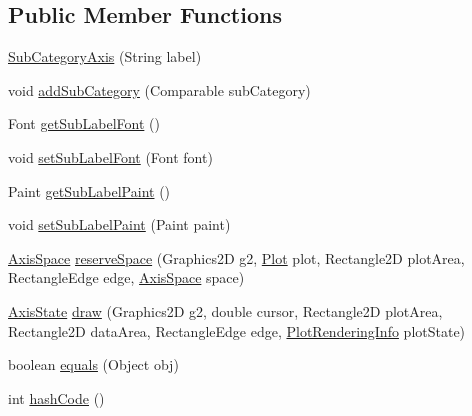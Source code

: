\subsection*{Public Member Functions}
\begin{DoxyCompactItemize}
\item 
\mbox{\hyperlink{classorg_1_1jfree_1_1chart_1_1axis_1_1_sub_category_axis_aa390eacde9febfc38334f4cbb459934f}{Sub\+Category\+Axis}} (String label)
\item 
void \mbox{\hyperlink{classorg_1_1jfree_1_1chart_1_1axis_1_1_sub_category_axis_ab0768eff94549a4a670454a1e7070d35}{add\+Sub\+Category}} (Comparable sub\+Category)
\item 
Font \mbox{\hyperlink{classorg_1_1jfree_1_1chart_1_1axis_1_1_sub_category_axis_a8ba516ab1bc79bf6b3f2a0e98e25f759}{get\+Sub\+Label\+Font}} ()
\item 
void \mbox{\hyperlink{classorg_1_1jfree_1_1chart_1_1axis_1_1_sub_category_axis_a1b3e317afd77a78715ddcf1465be1461}{set\+Sub\+Label\+Font}} (Font font)
\item 
Paint \mbox{\hyperlink{classorg_1_1jfree_1_1chart_1_1axis_1_1_sub_category_axis_aef43f68433c27fb74ddc51d40681f91e}{get\+Sub\+Label\+Paint}} ()
\item 
void \mbox{\hyperlink{classorg_1_1jfree_1_1chart_1_1axis_1_1_sub_category_axis_a92b94ccece53829f092607e7331cd7ef}{set\+Sub\+Label\+Paint}} (Paint paint)
\item 
\mbox{\hyperlink{classorg_1_1jfree_1_1chart_1_1axis_1_1_axis_space}{Axis\+Space}} \mbox{\hyperlink{classorg_1_1jfree_1_1chart_1_1axis_1_1_sub_category_axis_aa5dffd9ba5e9aa087a9cf9ef801433fc}{reserve\+Space}} (Graphics2D g2, \mbox{\hyperlink{classorg_1_1jfree_1_1chart_1_1plot_1_1_plot}{Plot}} plot, Rectangle2D plot\+Area, Rectangle\+Edge edge, \mbox{\hyperlink{classorg_1_1jfree_1_1chart_1_1axis_1_1_axis_space}{Axis\+Space}} space)
\item 
\mbox{\hyperlink{classorg_1_1jfree_1_1chart_1_1axis_1_1_axis_state}{Axis\+State}} \mbox{\hyperlink{classorg_1_1jfree_1_1chart_1_1axis_1_1_sub_category_axis_aaf0dd053b90ccc1ae26da1391e5a7c59}{draw}} (Graphics2D g2, double cursor, Rectangle2D plot\+Area, Rectangle2D data\+Area, Rectangle\+Edge edge, \mbox{\hyperlink{classorg_1_1jfree_1_1chart_1_1plot_1_1_plot_rendering_info}{Plot\+Rendering\+Info}} plot\+State)
\item 
boolean \mbox{\hyperlink{classorg_1_1jfree_1_1chart_1_1axis_1_1_sub_category_axis_a37ed3a22a4eae46b1182e478da2267aa}{equals}} (Object obj)
\item 
int \mbox{\hyperlink{classorg_1_1jfree_1_1chart_1_1axis_1_1_sub_category_axis_a48bbe35f7bea704a62ccc37d14f2133e}{hash\+Code}} ()
\end{DoxyCompactItemize}
